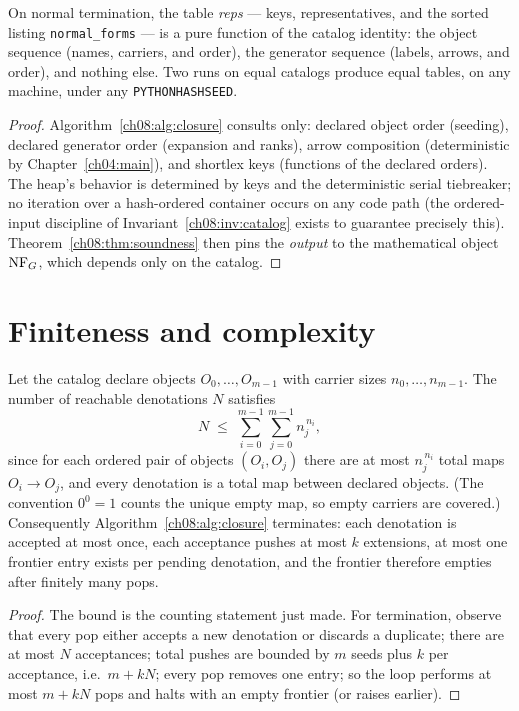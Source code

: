 \begin{corollary}\label{ch08:cor:stability}
On normal termination, the table \emph{reps} --- keys, representatives, and
the sorted listing \texttt{normal\_forms} --- is a pure function of the
catalog identity: the object sequence (names, carriers, and order), the
generator sequence (labels, arrows, and order), and nothing else. Two runs
on equal catalogs produce equal tables, on any machine, under any
\texttt{PYTHONHASHSEED}.
\end{corollary}

\begin{proof}
Algorithm~\ref{ch08:alg:closure} consults only: declared object order
(seeding), declared generator order (expansion and ranks), arrow composition
(deterministic by Chapter~\ref{ch04:main}), and shortlex keys (functions of
the declared orders). The heap's behavior is determined by keys and the
deterministic serial tiebreaker; no iteration over a hash-ordered container
occurs on any code path (the ordered-input discipline of
Invariant~\ref{ch08:inv:catalog} exists to guarantee precisely this).
Theorem~\ref{ch08:thm:soundness} then pins the \emph{output} to the
mathematical object $\mathrm{NF}_G$, which depends only on the catalog.
\end{proof}

\section{Finiteness and complexity}\label{ch08:sec:complexity}

\begin{proposition}\label{ch08:prop:finite}
Let the catalog declare objects $O_0,\dots,O_{m-1}$ with carrier sizes
$n_0,\dots,n_{m-1}$. The number of reachable denotations $N$ satisfies
\[
N \;\le\; \sum_{i=0}^{m-1}\sum_{j=0}^{m-1} n_j^{\,n_i},
\]
since for each ordered pair of objects $(O_i,O_j)$ there are at most
$n_j^{\,n_i}$ total maps $O_i\to O_j$, and every denotation is a total map
between declared objects. (The convention $0^0=1$ counts the unique empty
map, so empty carriers are covered.) Consequently
Algorithm~\ref{ch08:alg:closure} terminates: each denotation is accepted at
most once, each acceptance pushes at most $k$ extensions, at most one
frontier entry exists per pending denotation, and the frontier therefore
empties after finitely many pops.
\end{proposition}

\begin{proof}
The bound is the counting statement just made. For termination, observe that
every pop either accepts a new denotation or discards a duplicate; there are
at most $N$ acceptances; total pushes are bounded by $m$ seeds plus $k$ per
acceptance, i.e.\ $m+kN$; every pop removes one entry; so the loop performs
at most $m+kN$ pops and halts with an empty frontier (or raises earlier).
\end{proof}

